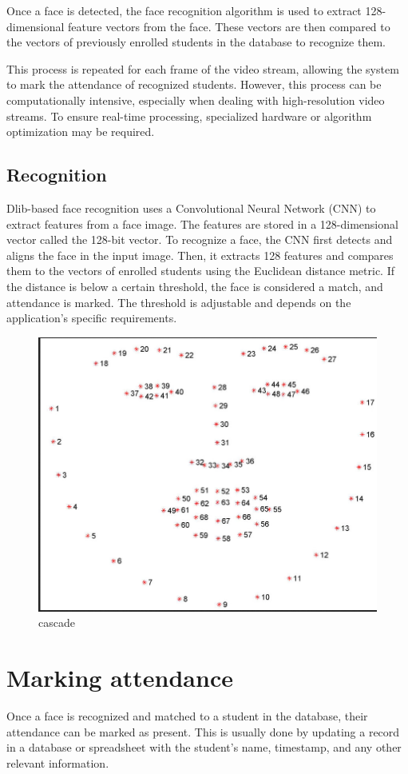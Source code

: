 Once a face is detected, the face recognition algorithm is used to extract 128-dimensional feature vectors from the face. These vectors are then compared to the vectors of previously enrolled students in the database to recognize them.

This process is repeated for each frame of the video stream, allowing the system to mark the attendance of recognized students. However, this process can be computationally intensive, especially when dealing with high-resolution video streams. To ensure real-time processing, specialized hardware or algorithm optimization may be required.

\subsection{Recognition}
Dlib-based face recognition uses a Convolutional Neural Network (CNN) to extract features from a face image. The features are stored in a 128-dimensional vector called the 128-bit vector. To recognize a face, the CNN first detects and aligns the face in the input image. Then, it extracts 128 features and compares them to the vectors of enrolled students using the Euclidean distance metric. If the distance is below a certain threshold, the face is considered a match, and attendance is marked. The threshold is adjustable and depends on the application's specific requirements.

\begin{figure}[!htb]
    \centering
    \includegraphics[width=\linewidth,height=0.8\linewidth]{Figures/Ch01/128bit.png}
    \caption{cascade}
    \label{figure:cascade}
    \end{figure}

\section{Marking attendance}
Once a face is recognized and matched to a student in the database, their attendance can be marked as present. This is usually done by updating a record in a database or spreadsheet with the student's name, timestamp, and any other relevant information.